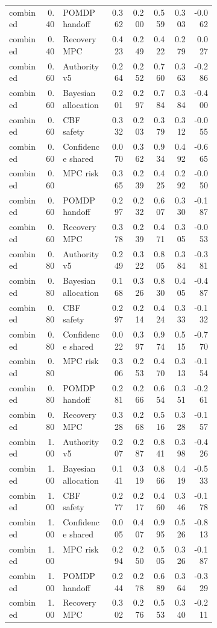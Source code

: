 \documentclass{article}
\begin{document}
\begin{center}
\begin{longtable}{p{0.17\linewidth}rp{0.23\linewidth}rrrrr}
combined & 0.40 & POMDP handoff & 0.362 & 0.200 & 0.559 & 0.303 & -0.062\\
combined & 0.40 & Recovery MPC & 0.423 & 0.249 & 0.422 & 0.279 & 0.027\\
combined & 0.60 & Authority v5 & 0.264 & 0.252 & 0.760 & 0.363 & -0.286\\
combined & 0.60 & Bayesian allocation & 0.201 & 0.297 & 0.784 & 0.384 & -0.400\\
combined & 0.60 & CBF safety & 0.332 & 0.203 & 0.379 & 0.312 & -0.055\\
combined & 0.60 & Confidence shared & 0.070 & 0.362 & 0.934 & 0.492 & -0.665\\
combined & 0.60 & MPC risk & 0.365 & 0.239 & 0.425 & 0.292 & -0.050\\
combined & 0.60 & POMDP handoff & 0.297 & 0.232 & 0.607 & 0.330 & -0.187\\
combined & 0.60 & Recovery MPC & 0.378 & 0.239 & 0.471 & 0.305 & -0.053\\
combined & 0.80 & Authority v5 & 0.249 & 0.322 & 0.805 & 0.384 & -0.381\\
combined & 0.80 & Bayesian allocation & 0.168 & 0.326 & 0.830 & 0.405 & -0.487\\
combined & 0.80 & CBF safety & 0.297 & 0.214 & 0.424 & 0.333 & -0.132\\
combined & 0.80 & Confidence shared & 0.022 & 0.397 & 0.974 & 0.515 & -0.770\\
combined & 0.80 & MPC risk & 0.306 & 0.253 & 0.470 & 0.313 & -0.154\\
combined & 0.80 & POMDP handoff & 0.281 & 0.266 & 0.654 & 0.351 & -0.261\\
combined & 0.80 & Recovery MPC & 0.328 & 0.268 & 0.516 & 0.328 & -0.157\\
combined & 1.00 & Authority v5 & 0.207 & 0.287 & 0.841 & 0.398 & -0.426\\
combined & 1.00 & Bayesian allocation & 0.141 & 0.319 & 0.866 & 0.419 & -0.533\\
combined & 1.00 & CBF safety & 0.277 & 0.217 & 0.460 & 0.346 & -0.178\\
combined & 1.00 & Confidence shared & 0.005 & 0.407 & 0.995 & 0.526 & -0.813\\
combined & 1.00 & MPC risk & 0.294 & 0.250 & 0.505 & 0.326 & -0.187\\
combined & 1.00 & POMDP handoff & 0.244 & 0.278 & 0.689 & 0.364 & -0.329\\
combined & 1.00 & Recovery MPC & 0.302 & 0.276 & 0.553 & 0.340 & -0.211\\

\end{longtable}
\end{center}
\end{document}

